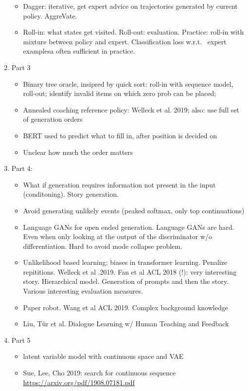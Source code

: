 \documentclass[12pt,a4paper]{article}
\begin{document}
\begin{enumerate}
\begin{itemize}
\item Dagger: iterative, get expert advice on trajectories generated by current policy. AggreVate.
\item Roll-in: what states get visited. Roll-out: evaluation. Practice: roll-in with mixture between policy and expert. Classification loss w.r.t. ~expert examplesa often sufficient in practice. 
\end{itemize}
\item Part 3
\begin{itemize}
\item Binary tree oracle, insipred by quick sort: roll-in with sequence model, roll-out; identify invalid items on which zero prob can be placed; 
\item Annealed coaching reference policy: Welleck et al. 2019; also: use full set of generation orders 
\item BERT used to predict what to fill in, after position is decided on
\item Unclear how much the order matters 
\end{itemize}
\item Part 4:
\begin{itemize}
\item What if generation requires information not present in the input (conditoning). Story generation. 
\item Avoid generating unlikely events (peaked softmax, only top continuations)
\item Language GANs for open ended generation. Language GANs are hard. Even when only looking at the output of the discriminator w/o differentiation. Hard to avoid mode collapse problem.
\item Unlikelihood based learning; biases in transformer learning.  Penalize repititions. Welleck et al .2019. Fan et al ACL 2018 (!): very interesting story. Hierarchical model. Generation of prompts and then the story. Various interesting evaluation measures. 
\item Paper robot. Wang et al ACL 2019. Complex background knowledge
\item Liu, T\"ur et al. Dialogue Learning w/ Human Teaching and Feedback 
\end{itemize}
\item Part 5
\begin{itemize}
\item latent variable model with continuous space and VAE
\item Sue, Lee, Cho 2019: search for continuous sequence  \url{https://arxiv.org/pdf/1908.07181.pdf}
\end{itemize}
\end{enumerate}
\end{document}
